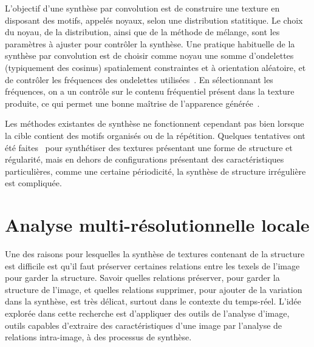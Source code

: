 L'objectif d'une synthèse par convolution est de construire une texture en disposant des motifs, appelés noyaux, selon une distribution statitique. Le choix du noyau, de la distribution, ainsi que de la méthode de mélange, sont les paramètres à ajuster pour contrôler la synthèse. Une pratique habituelle de la synthèse par convolution est de choisir comme noyau une somme d'ondelettes (typiquement des cosinus) spatialement constraintes et à orientation aléatoire, et de contrôler les fréquences des ondelettes utilisées~\cite{tricard_procedural_2019}. En sélectionnant les fréquences, on a un contrôle sur le contenu fréquentiel présent dans la texture produite, ce qui permet une bonne maîtrise de l'apparence générée~\cite{gilet_local_2014}.

Les méthodes existantes de synthèse ne fonctionnent cependant pas bien lorsque la cible contient des motifs organisés ou de la répétition. Quelques tentatives ont été faites~\cite{lutz_cyclostationary-gaussian_2021} pour synthétiser des textures présentant une forme de structure et régularité, mais en dehors de configurations présentant des caractéristiques particulières, comme une certaine périodicité, la synthèse de structure irrégulière est compliquée.



\section{Analyse multi-résolutionnelle locale}

Une des raisons pour lesquelles la synthèse de textures contenant de la structure est difficile est qu'il faut préserver certaines relations entre les texels de l'image pour garder la structure. Savoir quelles relations préserver, pour garder la structure de l'image, et quelles relations supprimer, pour ajouter de la variation dans la synthèse, est très délicat, surtout dans le contexte du temps-réel. L'idée explorée dans cette recherche est d'appliquer des outils de l'analyse d'image, outils capables d'extraire des caractéristiques d'une image par l'analyse de relations intra-image, à des processus de synthèse.

